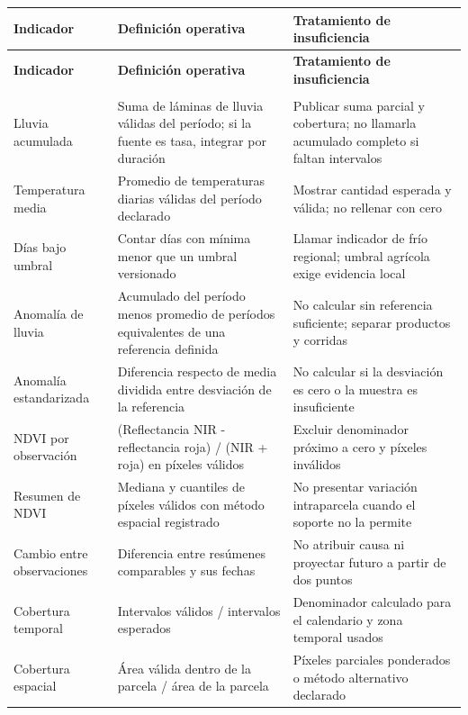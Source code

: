 \documentclass[10pt,a4paper]{article}
\begin{document}
\begingroup\small
\begin{longtable}{>{\raggedright\arraybackslash}p{3.647cm}>{\raggedright\arraybackslash}p{5.867cm}>{\raggedright\arraybackslash}p{6.343cm}}
\toprule
\textbf{Indicador} & \textbf{Definición operativa} & \textbf{Tratamiento de insuficiencia} \\
\midrule\endfirsthead
\toprule
\textbf{Indicador} & \textbf{Definición operativa} & \textbf{Tratamiento de insuficiencia} \\
\midrule\endhead
\midrule\multicolumn{3}{r}{\scriptsize Continúa en la página siguiente}\\\endfoot
\bottomrule\endlastfoot
Lluvia acumulada & Suma de láminas de lluvia válidas del período; si la fuente es tasa, integrar por duración & Publicar suma parcial y cobertura; no llamarla acumulado completo si faltan intervalos \\[3pt]
Temperatura media & Promedio de temperaturas diarias válidas del período declarado & Mostrar cantidad esperada y válida; no rellenar con cero \\[3pt]
Días bajo umbral & Contar días con mínima menor que un umbral versionado & Llamar indicador de frío regional; umbral agrícola exige evidencia local \\[3pt]
Anomalía de lluvia & Acumulado del período menos promedio de períodos equivalentes de una referencia definida & No calcular sin referencia suficiente; separar productos y corridas \\[3pt]
Anomalía estandarizada & Diferencia respecto de media dividida entre desviación de la referencia & No calcular si la desviación es cero o la muestra es insuficiente \\[3pt]
NDVI por observación & (Reflectancia NIR - reflectancia roja) /\allowbreak{} (NIR + roja) en píxeles válidos & Excluir denominador próximo a cero y píxeles inválidos \\[3pt]
Resumen de NDVI & Mediana y cuantiles de píxeles válidos con método espacial registrado & No presentar variación intraparcela cuando el soporte no la permite \\[3pt]
Cambio entre observaciones & Diferencia entre resúmenes comparables y sus fechas & No atribuir causa ni proyectar futuro a partir de dos puntos \\[3pt]
Cobertura temporal & Intervalos válidos /\allowbreak{} intervalos esperados & Denominador calculado para el calendario y zona temporal usados \\[3pt]
Cobertura espacial & Área válida dentro de la parcela /\allowbreak{} área de la parcela & Píxeles parciales ponderados o método alternativo declarado \\[3pt]
\end{longtable}
\endgroup
\end{document}
